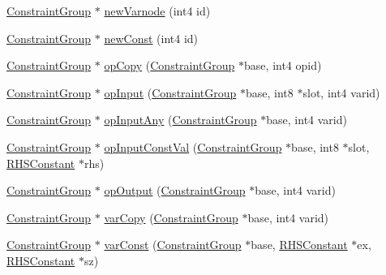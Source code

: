 \begin{DoxyCompactItemize}
\item 
\mbox{\hyperlink{class_constraint_group}{Constraint\+Group}} $\ast$ \mbox{\hyperlink{class_rule_compile_aa7a93b1504c557085a0bc20404a9fa0e}{new\+Varnode}} (int4 id)
\item 
\mbox{\hyperlink{class_constraint_group}{Constraint\+Group}} $\ast$ \mbox{\hyperlink{class_rule_compile_a98f4708162d55acb64b962958eadef9e}{new\+Const}} (int4 id)
\item 
\mbox{\hyperlink{class_constraint_group}{Constraint\+Group}} $\ast$ \mbox{\hyperlink{class_rule_compile_ae37bf9b34cbade3a2575269cc020ac95}{op\+Copy}} (\mbox{\hyperlink{class_constraint_group}{Constraint\+Group}} $\ast$base, int4 opid)
\item 
\mbox{\hyperlink{class_constraint_group}{Constraint\+Group}} $\ast$ \mbox{\hyperlink{class_rule_compile_a0700b701969b6c7a11ad4894468bb503}{op\+Input}} (\mbox{\hyperlink{class_constraint_group}{Constraint\+Group}} $\ast$base, int8 $\ast$slot, int4 varid)
\item 
\mbox{\hyperlink{class_constraint_group}{Constraint\+Group}} $\ast$ \mbox{\hyperlink{class_rule_compile_a13d09bbd5d5ac72fa2b6b05068f6d101}{op\+Input\+Any}} (\mbox{\hyperlink{class_constraint_group}{Constraint\+Group}} $\ast$base, int4 varid)
\item 
\mbox{\hyperlink{class_constraint_group}{Constraint\+Group}} $\ast$ \mbox{\hyperlink{class_rule_compile_a67d75997f4902ef6db8719a44a7a0617}{op\+Input\+Const\+Val}} (\mbox{\hyperlink{class_constraint_group}{Constraint\+Group}} $\ast$base, int8 $\ast$slot, \mbox{\hyperlink{class_r_h_s_constant}{R\+H\+S\+Constant}} $\ast$rhs)
\item 
\mbox{\hyperlink{class_constraint_group}{Constraint\+Group}} $\ast$ \mbox{\hyperlink{class_rule_compile_aa260ec5e4713a9c56086260609a8a835}{op\+Output}} (\mbox{\hyperlink{class_constraint_group}{Constraint\+Group}} $\ast$base, int4 varid)
\item 
\mbox{\hyperlink{class_constraint_group}{Constraint\+Group}} $\ast$ \mbox{\hyperlink{class_rule_compile_a45977afd1a9c72061ff1ac31fb3dd60c}{var\+Copy}} (\mbox{\hyperlink{class_constraint_group}{Constraint\+Group}} $\ast$base, int4 varid)
\item 
\mbox{\hyperlink{class_constraint_group}{Constraint\+Group}} $\ast$ \mbox{\hyperlink{class_rule_compile_ab8273a9c72b40019fade0814a0ebd44d}{var\+Const}} (\mbox{\hyperlink{class_constraint_group}{Constraint\+Group}} $\ast$base, \mbox{\hyperlink{class_r_h_s_constant}{R\+H\+S\+Constant}} $\ast$ex, \mbox{\hyperlink{class_r_h_s_constant}{R\+H\+S\+Constant}} $\ast$sz)

\end{DoxyCompactItemize}
